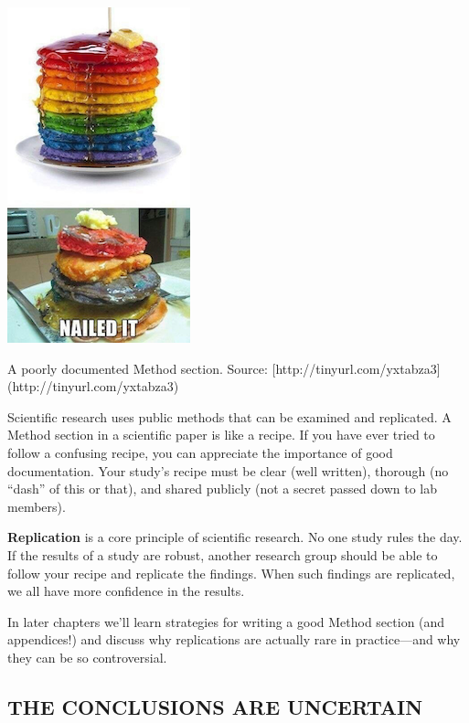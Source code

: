 \documentclass[justified,twoside,symmetric,]{tufte-book}
\begin{document}
\begin{marginfigure}
\includegraphics{images/pancakes2} \caption[A poorly documented Method section]{A poorly documented Method section. Source: [http://tinyurl.com/yxtabza3](http://tinyurl.com/yxtabza3)}\label{fig:pancakes}
\end{marginfigure}

Scientific research uses public methods that can be examined and replicated. A Method section in a scientific paper is like a recipe. If you have ever tried to follow a confusing recipe, you can appreciate the importance of good documentation. Your study's recipe must be clear (well written), thorough (no ``dash'' of this or that), and shared publicly (not a secret passed down to lab members).

\textbf{Replication} is a core principle of scientific research. No one study rules the day. If the results of a study are robust, another research group should be able to follow your recipe and replicate the findings. When such findings are replicated, we all have more confidence in the results.

In later chapters we'll learn strategies for writing a good Method section (and appendices!) and discuss why replications are actually rare in practice---and why they can be so controversial.

\hypertarget{the-conclusions-are-uncertain}{%
\subsection*{THE CONCLUSIONS ARE UNCERTAIN}\label{the-conclusions-are-uncertain}}
\end{document}
